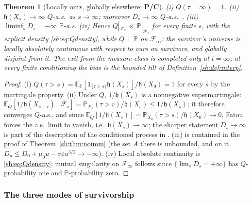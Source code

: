 \documentclass[11pt]{article}
\numberwithin{equation}{section}
\theoremstyle{plain}
\newtheorem{theorem}{Theorem}[section]
\theoremstyle{definition}
\theoremstyle{remark}
\newcommand{\E}{\mathbb{E}}
\newcommand{\PP}{\mathbb{P}}
\newcommand{\one}{\mathbf{1}}
\newcommand{\Fc}{\mathcal{F}}
\newcommand{\hm}{\mathfrak{h}}
\begin{document}
\begin{theorem}[Locally ours, globally elsewhere; \textbf{P/C}]
\label{sh:thm:singular}
\emph{(i)} $Q(\tau=\infty)=1$.
\emph{(ii)} $\hm(X_s)\to\infty$ $Q$-a.s.\ as $s\to\infty$; moreover
$D_s\to\infty$ $Q$-a.s.\ \cite{GJW99}.
\emph{(iii)} $\liminf_sD_s=-\infty$ $\PP$-a.s.
\emph{(iv)} Hence $Q|_{\Fc_s}\ll\PP|_{\Fc_s}$ for every finite $s$, with
the explicit density \eqref{sh:eq:Qdensity}, while $Q\perp\PP$ on
$\Fc_\infty$: the survivor's universe is locally absolutely continuous
with respect to ours on survivors, and globally disjoint from it. The
exit from the measure class is completed only at $t=\infty$; at every
finite conditioning the bias is the bounded tilt of
Definition~\ref{sh:def:interp}.
\end{theorem}

\begin{proof}
(i) $Q(\tau>s)=\E_\PP[\one_{\{\tau>s\}}\hm(X_s)]/\hm(X_0)=1$ for every
$s$ by the martingale property. (ii) Under $Q$, $1/\hm(X_s)$ is a
nonnegative supermartingale:
$\E_Q[1/\hm(X_{s+r})\mid\Fc_s]
=\PP_{X_s}(\tau>r)/\hm(X_s)\le1/\hm(X_s)$; it therefore converges
$Q$-a.s., and since
$\E_Q[1/\hm(X_s)]=\PP_{X_0}(\tau>s)/\hm(X_0)\to0$, Fatou forces the a.s.\
limit to vanish, i.e.\ $\hm(X_s)\to\infty$; the sharper statement
$D_s\to\infty$ is part of the description of the conditioned process in
\cite{GJW99}. (iii) is contained in the proof of
Theorem~\ref{sh:thm:noimm} (the set $A$ there is unbounded, and on it
$D_u\le D_0+\mu_0u-\sigma\varepsilon u^{3/2}\to-\infty$). (iv) Local
absolute continuity is \eqref{sh:eq:Qdensity}; mutual singularity on
$\Fc_\infty$ follows since $\{\lim_sD_s=+\infty\}$ has $Q$-probability
one and $\PP$-probability zero.
\end{proof}

\subsubsection{The three modes of survivorship}\label{sh:subsub:modes}
\end{document}

